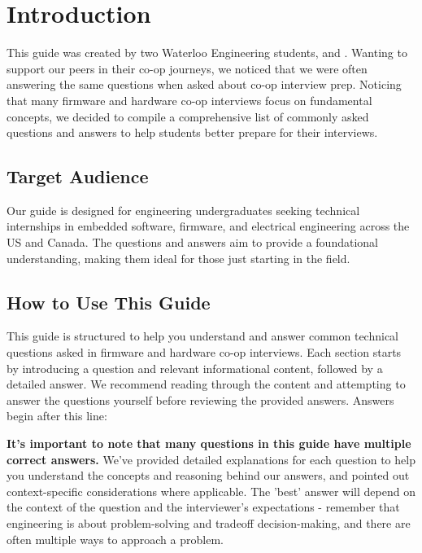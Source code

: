 \documentclass[main.tex]{subfiles}
\begin{document}
\section{Introduction}

This guide was created by two Waterloo Engineering students,  and . Wanting to support our peers in their co-op journeys, we noticed that we were often answering the same questions when asked about co-op interview prep. Noticing that many firmware and hardware co-op interviews focus on fundamental concepts, we decided to compile a comprehensive list of commonly asked questions and answers to help students better prepare for their interviews.

\subsection{Target Audience}
Our guide is designed for engineering undergraduates seeking technical internships in embedded software, firmware, and electrical engineering across the US and Canada. The questions and answers aim to provide a foundational understanding, making them ideal for those just starting in the field.

\subsection{How to Use This Guide}
This guide is structured to help you understand and answer common technical questions asked in firmware and hardware co-op interviews. Each section starts by introducing a question and relevant informational content, followed by a detailed answer. We recommend reading through the content and attempting to answer the questions yourself before reviewing the provided answers. Answers begin after this line: 

\spoilerlineraw

\noindent \textbf{It's important to note that many questions in this guide have multiple correct answers.} We've provided detailed explanations for each question to help you understand the concepts and reasoning behind our answers, and pointed out context-specific considerations where applicable. The 'best' answer will depend on the context of the question and the interviewer's expectations - remember that engineering is about problem-solving and tradeoff decision-making, and there are often multiple ways to approach a problem. \newline 
\end{document}
